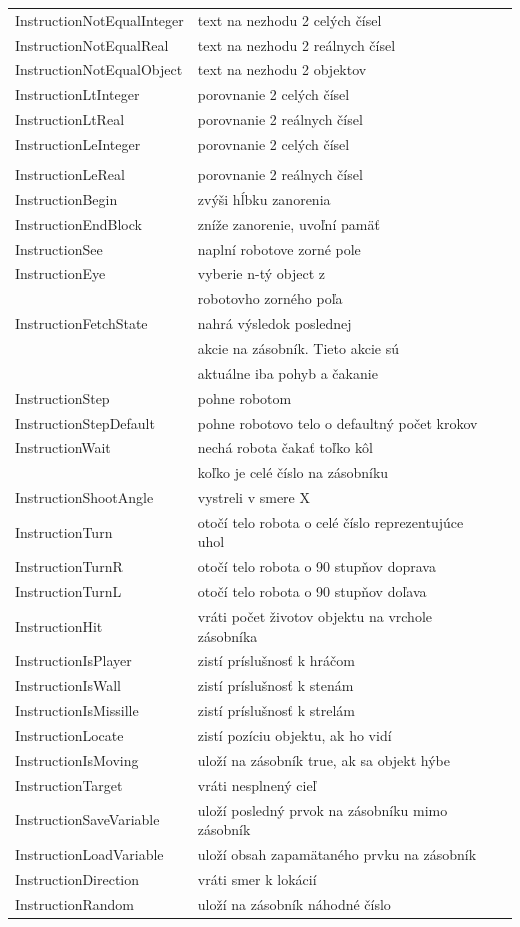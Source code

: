 \begin{center}
\begin{longtable}{|l|l|l|}
InstructionNotEqualInteger&text na nezhodu 2 celých čísel\\
InstructionNotEqualReal&text na nezhodu 2 reálnych čísel\\
InstructionNotEqualObject&text na nezhodu 2 objektov\\
InstructionLtInteger&porovnanie 2 celých čísel\\
InstructionLtReal&porovnanie 2 reálnych čísel\\
InstructionLeInteger&porovnanie 2 celých čísel\\\\
InstructionLeReal&porovnanie 2 reálnych čísel\\
InstructionBegin& zvýši hĺbku zanorenia\\
InstructionEndBlock& zníže zanorenie, uvoľní pamäť\\
InstructionSee& naplní robotove zorné pole\\
InstructionEye& vyberie n-tý object z \\
&robotovho zorného poľa\\
InstructionFetchState& nahrá výsledok poslednej \\
&akcie na zásobník. Tieto akcie sú \\
&aktuálne iba pohyb a čakanie\\
InstructionStep& pohne robotom\\
InstructionStepDefault& pohne robotovo telo o defaultný počet krokov\\
InstructionWait& nechá robota čakať toľko kôl\\
& koľko je celé číslo na zásobníku\\
InstructionShootAngle& vystreli v smere X\\
InstructionTurn& otočí telo robota o celé číslo reprezentujúce uhol \\
InstructionTurnR& otočí telo robota o 90 stupňov doprava\\
InstructionTurnL& otočí telo robota o 90 stupňov doľava\\
InstructionHit& vráti počet životov objektu na vrchole zásobníka\\
InstructionIsPlayer& zistí príslušnosť k hráčom\\
InstructionIsWall& zistí príslušnosť k stenám\\
InstructionIsMissille& zistí príslušnosť k strelám\\
InstructionLocate& zistí pozíciu objektu, ak ho vidí\\
InstructionIsMoving& uloží na zásobník true, ak sa objekt hýbe\\
InstructionTarget& vráti nesplnený cieľ\\
InstructionSaveVariable& uloží posledný prvok na zásobníku mimo zásobník\\
InstructionLoadVariable& uloží obsah zapamätaného prvku na zásobník \\
InstructionDirection& vráti smer k lokácií\\
InstructionRandom& uloží na zásobník náhodné číslo\\
\hline
\end{longtable}
\end{center}
